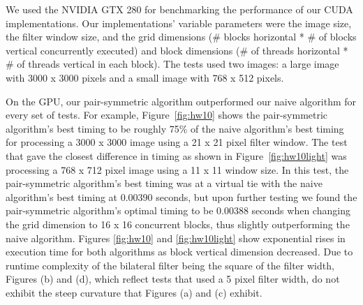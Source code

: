 \documentclass{IEEEtran}
\begin{document}
We used the NVIDIA GTX 280 for benchmarking the performance of our CUDA implementations. Our implementations' variable parameters were the image size, the filter window size, and the grid dimensions (\# blocks horizontal * \# of blocks vertical concurrently executed) and block dimensions (\# of threads horizontal * \# of threads vertical in each block). The tests used two images: a large image with 3000 x 3000 pixels and a small image with 768 x 512 pixels.

On the GPU, our pair-symmetric algorithm outperformed our naive algorithm for every set of tests. For example, Figure~\ref{fig:hw10} shows the pair-symmetric algorithm's best timing to be roughly 75\% of the naive algorithm's best timing for processing a 3000 x 3000 image using a 21 x 21 pixel filter window. The test that gave the closest difference in timing as shown in Figure~\ref{fig:hw10light} was processing a 768 x 712 pixel image using a 11 x 11 window size. In this test, the pair-symmetric algorithm's best timing was at a virtual tie with the naive algorithm's best timing at 0.00390 seconds, but upon further testing we found the pair-symmetric algorithm's optimal timing to be 0.00388 seconds when changing the grid dimension to 16 x 16 concurrent blocks, thus slightly outperforming the naive algorithm. Figures \ref{fig:hw10} and \ref{fig:hw10light} show exponential rises in execution time for both algorithms as block vertical dimension decreased. Due to runtime complexity of the bilateral filter being the square of the filter width, Figures (b) and (d), which reflect tests that used a 5 pixel filter width, do not exhibit the steep curvature that Figures (a) and (c) exhibit.
\end{document}
